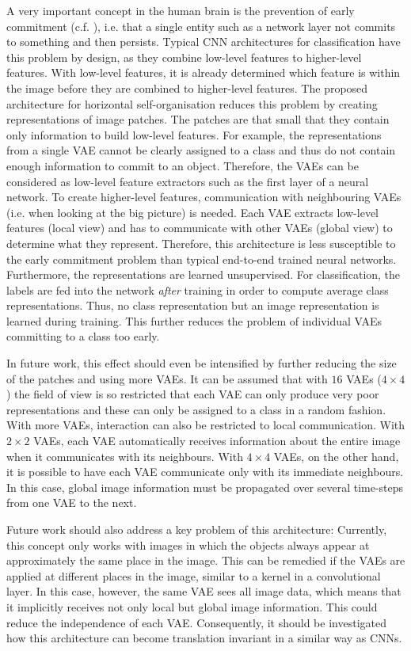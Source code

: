 A very important concept in the human brain is the prevention of early commitment (c.f. ), i.e. that a single entity such as a network layer not commits to something and then persists. Typical CNN architectures for classification have this problem by design, as they combine low-level features to higher-level features. With low-level features, it is already determined which feature is within the image before they are combined to higher-level features. The proposed architecture for horizontal self-organisation reduces this problem by creating representations of image patches. The patches are that small that they contain only information to build low-level features. For example, the representations from a single VAE cannot be clearly assigned to a class and thus do not contain enough information to commit to an object. Therefore, the VAEs can be considered as low-level feature extractors such as the first layer of a neural network. To create higher-level features, communication with neighbouring VAEs (i.e. when looking at the big picture) is needed. Each VAE extracts low-level features (local view) and has to communicate with other VAEs (global view) to determine what they represent. Therefore, this architecture is less susceptible to the early commitment problem than typical end-to-end trained neural networks. Furthermore, the representations are learned unsupervised. For classification, the labels are fed into the network \emph{after} training in order to compute average class representations. Thus, no class representation but an image representation is learned during training. This further reduces the problem of individual VAEs committing to a class too early.

In future work, this effect should even be intensified by further reducing the size of the patches and using more VAEs. It can be assumed that with $16$ VAEs ($4\times4$) the field of view is so restricted that each VAE can only produce very poor representations and these can only be assigned to a class in a random fashion. With more VAEs, interaction can also be restricted to local communication. With $2\times2$ VAEs, each VAE automatically receives information about the entire image when it communicates with its neighbours. With $4\times4$ VAEs, on the other hand, it is possible to have each VAE communicate only with its immediate neighbours. In this case, global image information must be propagated over several time-steps from one VAE to the next.

Future work should also address a key problem of this architecture: Currently, this concept only works with images in which the objects always appear at approximately the same place in the image. This can be remedied if the VAEs are applied at different places in the image, similar to a kernel in a convolutional layer. In this case, however, the same VAE sees all image data, which means that it implicitly receives not only local but global image information. This could reduce the independence of each VAE. Consequently, it should be investigated how this architecture can become translation invariant in a similar way as CNNs.


